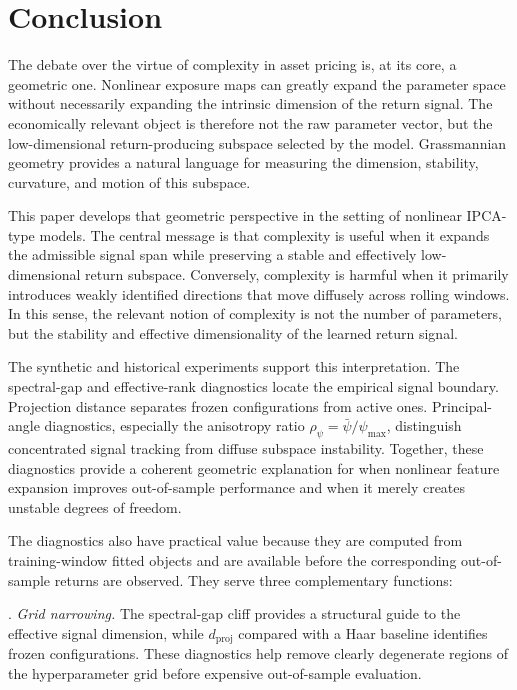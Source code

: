 \documentclass[11pt,letterpaper]{article}
\begin{document}
\section{Conclusion}
\label{sec:conclusion}

The debate over the virtue of complexity in asset pricing is, at its core, a geometric one. Nonlinear exposure maps can greatly expand the parameter space without necessarily expanding the intrinsic dimension of the return signal. The economically relevant object is therefore not the raw parameter vector, but the low-dimensional return-producing subspace selected by the model. Grassmannian geometry provides a natural language for measuring the dimension, stability, curvature, and motion of this subspace.

This paper develops that geometric perspective in the setting of nonlinear IPCA-type models. The central message is that complexity is useful when it expands the admissible signal span while preserving a stable and effectively low-dimensional return subspace. Conversely, complexity is harmful when it primarily introduces weakly identified directions that move diffusely across rolling windows. In this sense, the relevant notion of complexity is not the number of parameters, but the stability and effective dimensionality of the learned return signal.

The synthetic and historical experiments support this interpretation. The spectral-gap and effective-rank diagnostics locate the empirical signal boundary. Projection distance separates frozen configurations from active ones. Principal-angle diagnostics, especially the anisotropy ratio $\rho_\psi=\bar\psi/\psi_{\max}$, distinguish concentrated signal tracking from diffuse subspace instability. Together, these diagnostics provide a coherent geometric explanation for when nonlinear feature expansion improves out-of-sample performance and when it merely creates unstable degrees of freedom.

The diagnostics also have practical value because they are computed from training-window fitted objects and are available before the corresponding out-of-sample returns are observed. They serve three complementary functions:

\smallskip{}. \textit{Grid narrowing.} The spectral-gap cliff provides a structural guide to the effective signal dimension, while $d_{\mathrm{proj}}$ compared with a Haar baseline identifies frozen configurations. These diagnostics help remove clearly degenerate regions of the hyperparameter grid before expensive out-of-sample evaluation.
\end{document}
